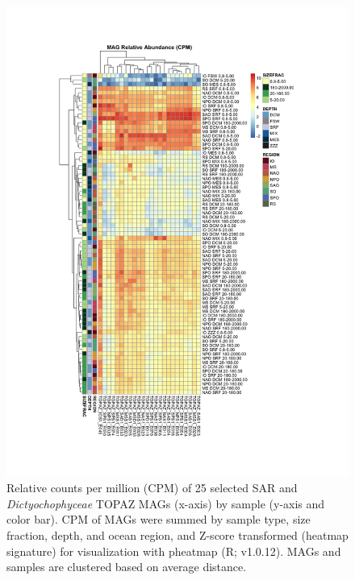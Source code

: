 \documentclass[12pt]{article}
\numberwithin{equation}{section}
\begin{document}
\begin{figure}
    \centering
    \includegraphics[width=0.95\columnwidth]{si-figures/SI-SAR-Dictyocho-MAG-MAG-relabun-bysample.png}
    \caption{Relative counts per million (CPM) of 25 selected SAR and \textit{Dictyochophyceae} TOPAZ MAGs (x-axis) by sample (y-axis and color bar). CPM of MAGs were summed by sample type, size fraction, depth, and ocean region, and Z-score transformed (heatmap signature) for visualization with pheatmap (R; v1.0.12). MAGs and samples are clustered based on average distance.
    }
    \label{fig:dictyocho-SAR-heatmap}
\end{figure}
\end{document}
